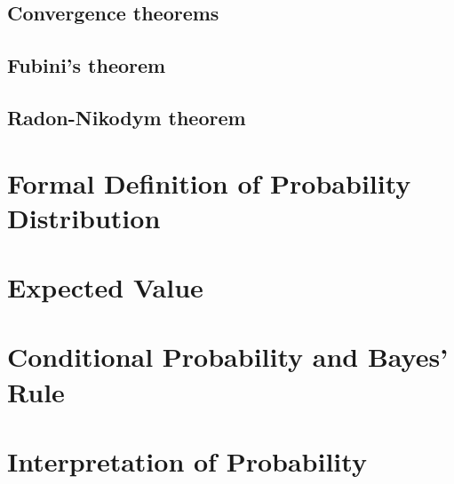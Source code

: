 \documentclass[12pt, a4paper]{report}
\begin{document}
    \subsection{Convergence theorems}
    \subsection{Fubini's theorem}
    \subsection{Radon-Nikodym theorem}

    \section{Formal Definition of Probability Distribution}

    \section{Expected Value}
    \section{Conditional Probability and Bayes' Rule}
    \section{Interpretation of Probability}
\end{document}
